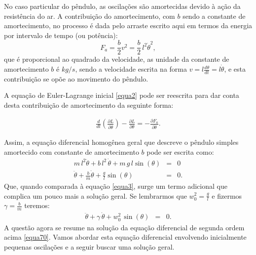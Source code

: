 \documentclass[12pt,openright,twoside,english,brazil]{abntex2}
\begin{document}
No caso particular do pêndulo, as oscilações são amortecidas devido à ação da resistência do ar. A contribuição do amortecimento, com $b$ sendo a constante de amortecimento, no processo é dada pelo arraste escrito aqui em termos da energia por intervalo de tempo (ou potência):
\begin{equation}
 F_a = \frac{b}{2} v^2 = \frac{b}{2} \, l^2 \dot{\theta}^2, \nonumber 
\end{equation}
que é proporcional ao quadrado da velocidade, as unidade da constante de amortecimento $b$ é $kg/s$, sendo a velocidade escrita na forma $v=l\frac{d \theta}{dt}=l\dot{\theta}$, e esta contribuição se opõe ao movimento do pêndulo.

A equação de Euler-Lagrange inicial \ref{equa2} pode ser reescrita para dar conta desta contribuição de amortecimento da seguinte forma:

\begin{eqnarray}
 \frac{d}{dt} \left( \frac{\partial L}{\partial \dot{\theta}} \right) - \frac{\partial L}{\partial \theta} = -\frac{\partial F_a}{\partial \dot{\theta}}.
 \label{equa68}
\end{eqnarray}

Assim, a equação diferencial homogênea geral que descreve o pêndulo simples amortecido com constante de amortecimento $b$ pode ser escrita como:
\begin{eqnarray}
 m\, l^2\ddot{\theta} + b\, l^2\, \dot{\theta} + m\, g \, l \sin{(\theta)} & = & 0 \nonumber \\
 \ddot{\theta} + \frac{b}{m} \dot{\theta} + \frac{g}{l} \sin{(\theta)} & = & 0.
 \label{equa69}
\end{eqnarray}
Que, quando comparada à equação \ref{equa3}, surge um termo adicional que complica um pouco mais a solução geral. Se lembrarmos que $w_0^2=\frac{g}{l}$ e fizermos $\gamma = \frac{b}{m}$ teremos:
\begin{eqnarray}
 \ddot{\theta} + \gamma \, \dot{\theta} + w_0^2 \, \sin{(\theta)} & = & 0.
 \label{equa70}   
\end{eqnarray}
A questão agora se resume na solução da equação diferencial de segunda ordem acima \ref{equa70}. Vamos abordar esta equação diferencial envolvendo inicialmente pequenas oscilações e a seguir buscar uma solução geral.
\end{document}
